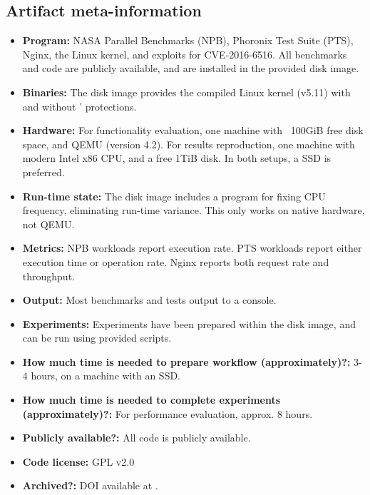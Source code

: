 \subsection{Artifact meta-information}



\begin{itemize}
  \item {\bf Program: } NASA Parallel Benchmarks (NPB), 
    Phoronix Test Suite (PTS), Nginx, the Linux kernel, and exploits for 
    CVE-2016-6516. 
    All benchmarks and code are publicly available, and are installed 
    in the provided disk image.
  \item {\bf Binaries: } The disk image provides the compiled Linux kernel (v5.11)
    with and without \midas{}' protections.
  \item {\bf Hardware: } 
    For functionality evaluation, one machine with ~100GiB free disk 
    space, and QEMU (version 4.2).
    For results reproduction, one machine with modern Intel x86 CPU, and 
    a free 1TiB disk.
    In both setups, a SSD is preferred.
  \item {\bf Run-time state: } The disk image includes a program for fixing
    CPU frequency, eliminating run-time variance. This only works on native 
    hardware, not QEMU.
  \item {\bf Metrics: } NPB workloads report execution rate. PTS
    workloads report either execution time or operation rate. 
    Nginx reports both request rate and throughput.
  \item {\bf Output: } Most benchmarks and tests output to a console.
  \item {\bf Experiments: } Experiments have been prepared within the disk image,
    and can be run using provided scripts.
  \item {\bf How much time is needed to prepare workflow (approximately)?: } 
    3-4 hours, on a machine with an SSD.
  \item {\bf How much time is needed to complete experiments (approximately)?: } 
    For performance evaluation, approx. 8 hours.
  \item {\bf Publicly available?: } All code is publicly available.
  \item {\bf Code license: } GPL v2.0
  \item {\bf Archived?: } 
    DOI \zenododoi available at \zenodorecord.
\end{itemize}
